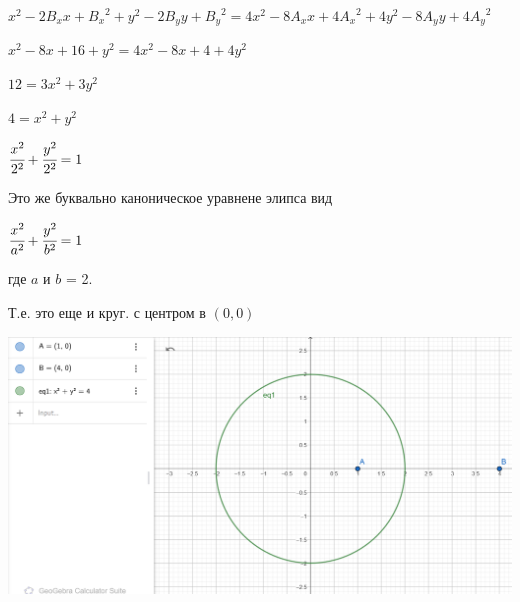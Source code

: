 \documentclass{article}
\begin{document}
$x^2 - 2B_xx + {B_x}^2 + y^2 - 2B_yy + {B_y}^2 = 4x^2 - 8A_xx + 4{A_x}^2 + 4y^2 - 8A_yy + 4{A_y}^2$

$x^2 - 8x + 16 + y^2 = 4x^2 - 8x + 4 + 4y^2$

$12 = 3x^2 + 3y^2$

$4 = x^2 + y^2$

$\cfrac{x^2}{2^2} + \cfrac{y^2}{2^2} = 1$

Это же буквально каноническое уравнене элипса вид

$\cfrac{x^2}{a^2} + \cfrac{y^2}{b^2} = 1$

где $a$ и $b$ = 2.

Т.е. это еще и круг. с центром в $(0, 0)$

\includegraphics[width=0.9\linewidth]{images/3_ball.png}

\clearpage
\end{document}
